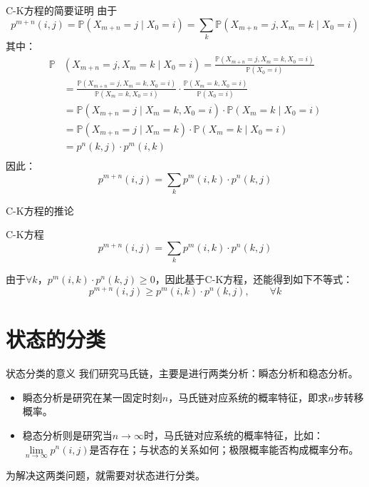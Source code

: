 \documentclass[t]{beamer}
\renewcommand{\Pr}{\mathbb{P}}
\begin{document}
\begin{frame}{C-K方程的简要证明}
    \small
    由于$$p^{m+n}(i,j)=\Pr(X_{m+n}=j\;|\;X_0=i)=\sum_k\Pr(X_{m+n}=j,X_m=k\;|\;X_0=i)$$
    其中：
    \[\begin{split}
    \Pr&(X_{m+n}=j,X_m=k\;|\;X_0=i)=\frac{\Pr(X_{m+n}=j,X_m=k,X_0=i)}{\Pr(X_0=i)}\\
    &=\frac{\Pr(X_{m+n}=j,X_m=k,X_0=i)}{\Pr(X_m=k,X_0=i)}\cdot \frac{\Pr(X_m=k,X_0=i)}{\Pr(X_0=i)}\\
    &={\Pr(X_{m+n}=j\;|\;X_m=k,X_0=i)}\cdot \Pr(X_m=k\;|\;X_0=i)\\
    &={\Pr(X_{m+n}=j\;|\;X_m=k)}\cdot \Pr(X_m=k\;|\;X_0=i)\\
    &={p^n(k,j)}\cdot p^m(i,k)\\
    \end{split}\]
    因此：$$p^{m+n}(i,j)=\sum_k p^m(i,k)\cdot p^n(k,j)$$
\end{frame}

\begin{frame}{C-K方程的推论}
\begin{block}{C-K方程}
    \begin{equation*}
        p^{m+n}(i,j)=\sum_k p^m(i,k)\cdot p^n(k,j)
        \end{equation*}
\end{block}

    由于$\forall k$，$p^m(i,k)\cdot p^n(k,j)\ge 0$，因此基于C-K方程，还能得到如下不等式：
    \begin{equation*}
    p^{m+n}(i,j)\ge  p^m(i,k)\cdot p^n(k,j) ,\qquad \forall k
    \end{equation*}
\end{frame}

\section{状态的分类}
\begin{frame}{状态分类的意义}
    我们研究马氏链，主要是进行两类分析：瞬态分析和稳态分析。
\begin{itemize}
    \item 瞬态分析是研究在某一固定时刻$n$，马氏链对应系统的概率特征，即求$n$步转移概率。
    \item 稳态分析则是研究当$n\to\infty$时，马氏链对应系统的概率特征，比如：$\lim\limits_{n\to\infty}p^n(i,j)$是否存在；与状态的关系如何；极限概率能否构成概率分布。
\end{itemize}
    
    为解决这两类问题，就需要对状态进行分类。
\end{frame}
\end{document}
